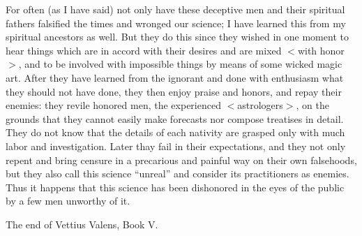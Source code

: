 For often (as I have said) not only have these deceptive men and their spiritual fathers falsified the times and wronged our science; I have learned this from my spiritual ancestors as well. But they do this
since they wished in one moment to hear things which are in accord with their desires and are mixed $<$with honor$>$, and to be involved with impossible things by means of some wicked magic art. After they have learned from the ignorant and done with enthusiasm what they should not have done, they then enjoy praise and honors, and repay their enemies: they revile honored men, the experienced $<$astrologers$>$, on the grounds that they cannot easily make forecasts nor compose treatises in detail. They do not know that the
details of each nativity are grasped only with much labor and investigation. Later thay fail in their expectations, and they not only repent and bring censure in a precarious and painful way on their own
falsehoods, but they also call this science “unreal” and consider its practitioners as enemies. Thus it happens that this science has been dishonored in the eyes of the public by a few men unworthy of it.

The end of Vettius Valens, Book V.

\newpage